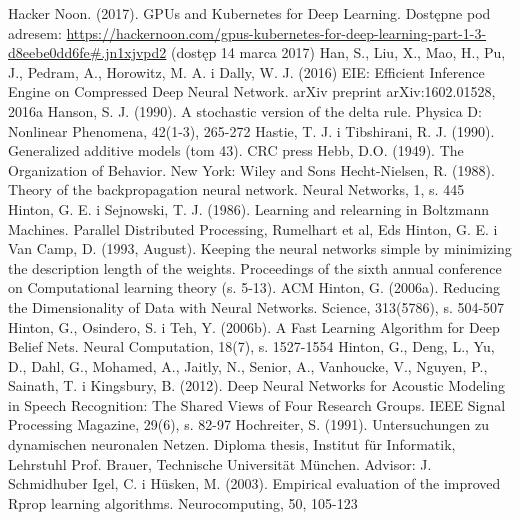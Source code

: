 \documentclass[12pt,a4paper,twoside]{article}
\begin{document}
\begin{thebibliography}{99}
 Hacker Noon. (2017). GPUs and Kubernetes for Deep Learning. Dostępne pod adresem: \url{https://hackernoon.com/gpus-kubernetes-for-deep-learning-part-1-3-d8eebe0dd6fe#.jn1xjvpd2} (dostęp 14 marca 2017)
 Han, S., Liu, X., Mao, H., Pu, J., Pedram, A., Horowitz, M. A. i Dally, W. J. (2016) EIE: Efficient Inference Engine on Compressed Deep Neural Network. arXiv preprint arXiv:1602.01528, 2016a
 Hanson, S. J. (1990). A stochastic version of the delta rule. Physica D: Nonlinear Phenomena, 42(1-3), 265-272
 Hastie, T. J. i Tibshirani, R. J. (1990). Generalized additive models (tom 43). CRC press
 Hebb, D.O. (1949). The Organization of Behavior. New York: Wiley and Sons
 Hecht-Nielsen, R. (1988). Theory of the backpropagation neural network. Neural Networks, 1, s. 445
 Hinton, G. E. i Sejnowski, T. J. (1986). Learning and relearning in Boltzmann Machines. Parallel Distributed Processing, Rumelhart et al, Eds
 Hinton, G. E. i Van Camp, D. (1993, August). Keeping the neural networks simple by minimizing the description length of the weights. Proceedings of the sixth annual conference on Computational learning theory (s. 5-13). ACM
 Hinton, G. (2006a). Reducing the Dimensionality of Data with Neural Networks. Science, 313(5786), s. 504-507
 Hinton, G., Osindero, S. i Teh, Y. (2006b). A Fast Learning Algorithm for Deep Belief Nets. Neural Computation, 18(7), s. 1527-1554
 Hinton, G., Deng, L., Yu, D., Dahl, G., Mohamed, A., Jaitly, N., Senior, A., Vanhoucke, V., Nguyen, P., Sainath, T. i Kingsbury, B. (2012). Deep Neural Networks for Acoustic Modeling in Speech Recognition: The Shared Views of Four Research Groups. IEEE Signal Processing Magazine, 29(6), s. 82-97
 Hochreiter, S. (1991). Untersuchungen zu dynamischen neuronalen Netzen. Diploma thesis, Institut für Informatik, Lehrstuhl Prof. Brauer, Technische Universität München. Advisor: J. Schmidhuber
 Igel, C. i Hüsken, M. (2003). Empirical evaluation of the improved Rprop learning algorithms. Neurocomputing, 50, 105-123

\end{thebibliography}
\end{document}
